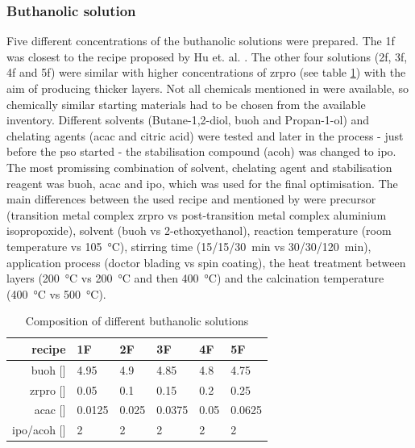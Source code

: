 \subsubsection{Buthanolic solution}
\label{sec:sol}
Five different concentrations of the buthanolic solutions were prepared. 
The \gls{1f} was closest to the recipe proposed by Hu et. al. \cite{Hu2016}. 
The other four solutions (\gls{2f}, \gls{3f}, \gls{4f} and \gls{5f}) were similar with 
higher concentrations of \gls{zrpro} (see table \ref{tab:rec2})
with the aim of producing thicker layers.
Not all chemicals mentioned in \cite{Hu2016} were available, so chemically similar 
starting materials had to be chosen from the available inventory. 
Different solvents (Butane-1,2-diol, \gls{buoh} and Propan-1-ol) and chelating agents 
(\gls{acac} and citric acid) were tested and later in the process - just before the 
\gls{pso} started - the stabilisation compound (\gls{acoh}) was changed to \gls{ipo}.
The most promissing combination of solvent, chelating agent and stabilisation reagent was 
\gls{buoh}, \gls{acac} and \gls{ipo}, which was used for the final optimisation.
The main differences between the used recipe and mentioned by \cite{Hu2016} were 
precursor (transition metal complex \gls{zrpro}	\gls{vs} post-transition metal 
complex aluminium isopropoxide), solvent (\gls{buoh} \gls{vs} 2-ethoxyethanol), reaction temperature 
(room temperature \gls{vs} \SI{105}{\celsius}), stirring time (15/15/\SI{30}{\minute}
\gls{vs} 30/30/\SI{120}{\minute}), application process (doctor blading \gls{vs} spin coating), 
the heat treatment between layers (\SI{200}{\celsius} \gls{vs} \SI{200}{\celsius} and then \SI{400}
{\celsius}) and the calcination temperature (\SI{400}{\celsius} \gls{vs}
\SI{500}{\celsius}).

\begin{table}[h]
	\centering
	\caption{Composition of different buthanolic solutions}
	\label{tab:rec2}
	\begin{tabular}{rlllll}
		\hline
		recipe	&1F		&2F		&3F		&4F		&5F		\\
		\hline
		\gls{buoh} [\ml{}]		&4.95	&4.9	&4.85	&4.8	&4.75	\\
		\gls{zrpro} [\ml{}]	&0.05	&0.1	&0.15	&0.2	&0.25	\\
		\gls{acac} [\ml{}]		&0.0125	&0.025	&0.0375	&0.05	&0.0625	\\
		\gls{ipo}/\gls{acoh} [\ml{}]		&2		&2		&2		&2		&2		\\
		\hline
	\end{tabular}
\end{table}

